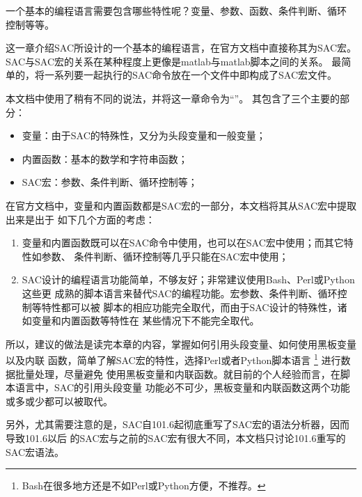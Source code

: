 一个基本的编程语言需要包含哪些特性呢？变量、参数、函数、条件判断、循环
控制等等。

这一章介绍SAC所设计的一个基本的编程语言，在官方文档中直接称其为SAC宏。
SAC与SAC宏的关系在某种程度上更像是matlab与matlab脚本之间的关系。
最简单的，将一系列要一起执行的SAC命令放在一个文件中即构成了SAC宏文件。

本文档中使用了稍有不同的说法，并将这一章命令为``''。
其包含了三个主要的部分：
\begin{itemize}
\item 变量：由于SAC的特殊性，又分为头段变量和一般变量；
\item 内置函数：基本的数学和字符串函数；
\item SAC宏：参数、条件判断、循环控制等；
\end{itemize}

在官方文档中，变量和内置函数都是SAC宏的一部分，本文档将其从SAC宏中提取出来是出于
如下几个方面的考虑：
\begin{enumerate}
\item 变量和内置函数既可以在SAC命令中使用，也可以在SAC宏中使用；而其它特性如参数、
    条件判断、循环控制等几乎只能在SAC宏中使用；
\item SAC设计的编程语言功能简单，不够友好；非常建议使用Bash、Perl或Python这些更
    成熟的脚本语言来替代SAC的编程功能。宏参数、条件判断、循环控制等特性都可以被
    脚本的相应功能完全取代，而由于SAC设计的特殊性，诸如变量和内置函数等特性在
    某些情况下不能完全取代。
\end{enumerate}

所以，建议的做法是读完本章的内容，掌握如何引用头段变量、如何使用黑板变量以及内联
函数，简单了解SAC宏的特性，选择Perl或者Python脚本语言
\footnote{Bash在很多地方还是不如Perl或Python方便，不推荐。}
进行数据批量处理，尽量避免
使用黑板变量和内联函数。就目前的个人经验而言，在脚本语言中，SAC的引用头段变量
功能必不可少，黑板变量和内联函数这两个功能或多或少都可以被取代。

另外，尤其需要注意的是，SAC自101.6起彻底重写了SAC宏的语法分析器，因而导致101.6以后
的SAC宏与之前的SAC宏有很大不同，本文档只讨论101.6重写的SAC宏语法。
